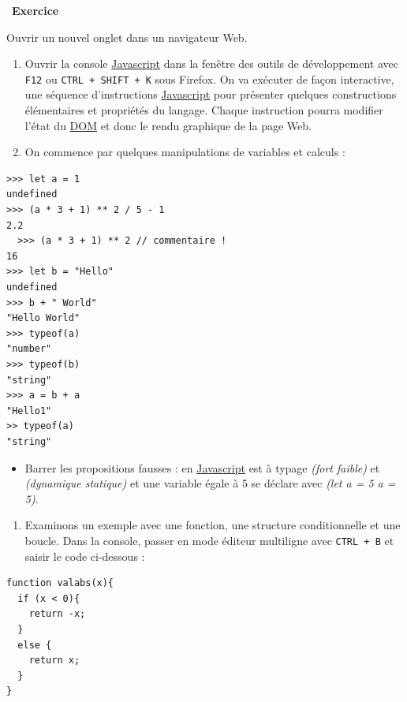 \documentclass[
  11pt,
]{article}
\newcommand{\passthrough}[1]{#1}
\providecommand{\tightlist}{%
  \setlength{\itemsep}{0pt}\setlength{\parskip}{0pt}}
\newcounter{exo}
\newenvironment{exercice}[1]
{\par \medskip   \addtocounter{exo}{1} \noindent  
\begin{bclogo}[arrondi =0.1,   noborder = true, logo=\bccrayon, marge=4]{~\textbf{Exercice} \textbf{\theexo} {\itshape #1} }  \par}
{
\end{bclogo}
 \par \bigskip }
\newcounter{prop}
\newcounter{def}
\begin{document}
\begin{exercice}{}

Ouvrir un nouvel onglet dans un navigateur Web.

\begin{enumerate}
\def\labelenumi{\arabic{enumi}.}
\item
  Ouvrir la console
  \href{https://developer.mozilla.org/fr/docs/Glossaire/JavaScript}{Javascript}
  dans la fenêtre des outils de développement avec
  \passthrough{\lstinline!F12!} ou
  \passthrough{\lstinline!CTRL + SHIFT + K!} sous Firefox. On va
  exécuter de façon interactive, une séquence d'instructions
  \href{https://developer.mozilla.org/fr/docs/Glossaire/JavaScript}{Javascript}
  pour présenter quelques constructions élémentaires et propriétés du
  langage. Chaque instruction pourra modifier l'état du
  \href{https://developer.mozilla.org/fr/docs/Glossaire/DOM}{DOM} et
  donc le rendu graphique de la page Web.
\item
  On commence par quelques manipulations de variables et calculs :
\end{enumerate}

\begin{lstlisting}
>>> let a = 1
undefined
>>> (a * 3 + 1) ** 2 / 5 - 1
2.2
  >>> (a * 3 + 1) ** 2 // commentaire !
16
>>> let b = "Hello"
undefined
>>> b + " World"
"Hello World"
>>> typeof(a)
"number"
>>> typeof(b)
"string"
>>> a = b + a
"Hello1"
>> typeof(a)
"string"
\end{lstlisting}

\begin{itemize}
\tightlist
\item
  Barrer les propositions fausses : en
  \href{https://developer.mozilla.org/fr/docs/Glossaire/JavaScript}{Javascript}
  est à typage \emph{(fort \textbar{} faible)} et \emph{(dynamique
  \textbar{} statique)} et une variable égale à 5 se déclare avec
  \emph{(let a = 5 \textbar{} a = 5)}.
\end{itemize}

\begin{enumerate}
\def\labelenumi{\arabic{enumi}.}
\setcounter{enumi}{2}
\tightlist
\item
  Examinons un exemple avec une fonction, une structure conditionnelle
  et une boucle. Dans la console, passer en mode éditeur multiligne avec
  \passthrough{\lstinline!CTRL + B!} et saisir le code ci-dessous :
\end{enumerate}

\begin{lstlisting}
function valabs(x){
  if (x < 0){
    return -x;
  }
  else {
    return x;
  }
}


\end{lstlisting}
\end{exercice}
\end{document}

